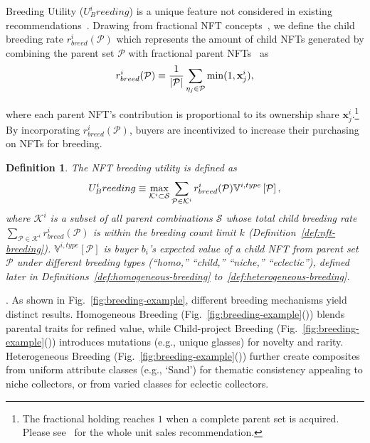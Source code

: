 \documentclass[conference]{IEEEtran}
\theoremstyle{plain}
\newtheorem{definition}{Definition}
\newcommand*{\defeq}{\equiv}
\begin{document}
\noindentNFT Breeding Utility ($U^i_Breeding$) is a unique feature not considered in existing recommendations~\cite{he2020lightgcn, yang2021consisrec}. Drawing from fractional NFT concepts~\cite{rowagames2023mechanics6, perplay2023amajulypart4}, we define the child breeding rate $r_{breed}^i(\mathcal{P})$ which represents the amount of child NFTs generated by combining the parent set $\mathcal{P}$ with fractional parent NFTs~\cite{rowagames2023mechanics6, perplay2023amajulypart4} as
\begin{equation}\small
    \label{eqn:breedrate}
    r_{breed}^i(\mathcal{P})\defeq \frac{1}{|\mathcal{P}|}\sum_{\eta_j\in\mathcal{P}}\min(1, \mathbf{x}^i_j),
\end{equation}

where each parent NFT's contribution is proportional to its ownership share $\mathbf{x}^i_j$.\footnote{The fractional holding reaches $1$ when a complete parent set is acquired. Please see~\cite{supplementary} for the whole unit sales recommendation.} By incorporating $r_{breed}^i(\mathcal{P})$, buyers are incentivized to increase their purchasing on NFTs for breeding.

\begin{definition}
    \label{def:buyer-utility-breeding}
    The NFT breeding utility is defined as
    \begin{equation}\small
    \label{eqn:breeding-utility}
    U^i_Breeding \defeq \max_{\mathcal{K}^i\subset\mathcal{S}} \sum_{\mathcal{P}\in \mathcal{K}^i}
    r_{breed}^i(\mathcal{P})\mathbb{V}^{i, type}\left[\mathcal{P}\right],
    \end{equation}
    where $\mathcal{K}^i$ is a subset of all parent combinations $\mathcal{S}$ whose total child breeding rate $\sum_{\mathcal{P}\in \mathcal{K}^i}r_{breed}^i(\mathcal{P})$ is within the breeding count limit $k$ (Definition~\ref{def:nft-breeding}). $\mathbb{V}^{i, type}[\mathcal{P}]$ is buyer $b_i$'s expected value of a child NFT from parent set $\mathcal{P}$ under different breeding types (``homo,'' ``child,'' ``niche,'' ``eclectic''), defined later in Definitions~\ref{def:homogeneous-breeding} to~\ref{def:heterogeneous-breeding}.
\end{definition}
\noindentExample. As shown in Fig.~\ref{fig:breeding-example}, different breeding mechanisms yield distinct results. Homogeneous Breeding (Fig.~\ref{fig:breeding-example}()) blends parental traits for refined value, while Child-project Breeding (Fig.~\ref{fig:breeding-example}()) introduces mutations (e.g., unique glasses) for novelty and rarity. Heterogeneous Breeding (Fig.~\ref{fig:breeding-example}()) further create composites from uniform attribute classes (e.g., `Sand') for thematic consistency appealing to niche collectors, or from varied classes for eclectic collectors. 
\end{document}
